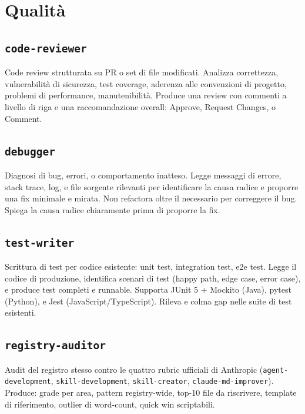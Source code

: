\documentclass[12pt,a4paper,twoside]{book}
\begin{document}
\chapter{Qualità}

\section{\texttt{code-reviewer}}

Code review strutturata su PR o set di file modificati. Analizza correttezza, vulnerabilità di sicurezza, test coverage, aderenza alle convenzioni di progetto, problemi di performance, manutenibilità. Produce una review con commenti a livello di riga e una raccomandazione overall: Approve, Request Changes, o Comment.

\section{\texttt{debugger}}

Diagnosi di bug, errori, o comportamento inatteso. Legge messaggi di errore, stack trace, log, e file sorgente rilevanti per identificare la causa radice e proporre una fix minimale e mirata. Non refactora oltre il necessario per correggere il bug. Spiega la causa radice chiaramente prima di proporre la fix.

\section{\texttt{test-writer}}

Scrittura di test per codice esistente: unit test, integration test, e2e test. Legge il codice di produzione, identifica scenari di test (happy path, edge case, error case), e produce test completi e runnable. Supporta JUnit 5 + Mockito (Java), pytest (Python), e Jest (JavaScript/TypeScript). Rileva e colma gap nelle suite di test esistenti.

\section{\texttt{registry-auditor}}

Audit del registro stesso contro le quattro rubric ufficiali di Anthropic (\texttt{agent-development}, \texttt{skill-development}, \texttt{skill-creator}, \texttt{claude-md-improver}). Produce: grade per area, pattern registry-wide, top-10 file da riscrivere, template di riferimento, outlier di word-count, quick win scriptabili.
\end{document}
